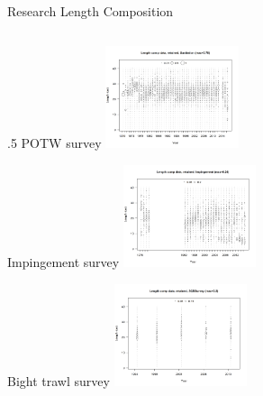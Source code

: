 \documentclass[ignorenonframetext,]{beamer}
\def\begincols{\begin{columns}}
\def\begincol{\begin{column}}
\def\endcol{\end{column}}
\def\endcols{\end{columns}}
\begin{document}
\begin{frame}{Research Length Composition}

\begincols
 \begincol{.5\textwidth} POTW survey
\includegraphics[height=3cm]{r4ss/plots_mod1/comp_lendat_bubflt7mkt2_page2.png}

Impingement survey
\includegraphics[height=3cm]{r4ss/plots_mod1/comp_lendat_bubflt10mkt2.png}

Bight trawl survey
\includegraphics[height=3cm]{r4ss/plots_mod1/comp_lendat_bubflt11mkt2.png}
\endcol
\endcols

\end{frame}
\end{document}
